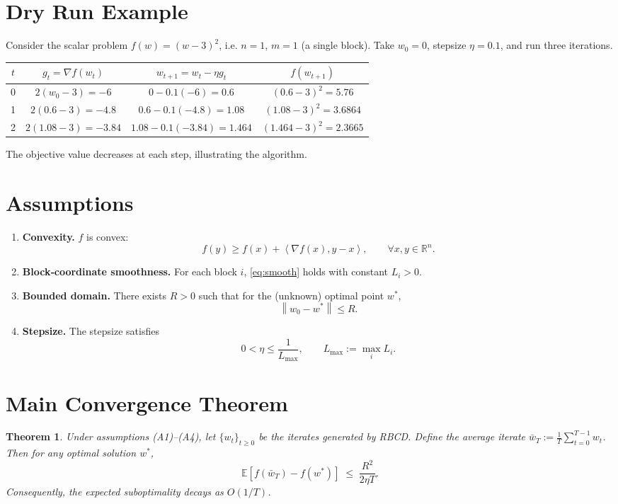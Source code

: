 \documentclass{article}
\newtheorem{theorem}{Theorem}
\newcommand{\E}{\mathbb{E}}
\newcommand{\R}{\mathbb{R}}
\newcommand{\norm}[1]{\left\|#1\right\|}
\newcommand{\ip}[2]{\left\langle #1,#2\right\rangle}
\begin{document}
\section*{Dry Run Example}
Consider the scalar problem $f(w)=(w-3)^2$, i.e. $n=1$, $m=1$ (a single block).  
Take $w_0=0$, stepsize $\eta=0.1$, and run three iterations.

\begin{center}
\begin{tabular}{c|c|c|c}
$t$ & $g_t=\nabla f(w_t)$ & $w_{t+1}=w_t-\eta g_t$ & $f(w_{t+1})$\\\hline
0 & $2(w_0-3)=-6$ & $0-0.1(-6)=0.6$ & $(0.6-3)^2=5.76$\\
1 & $2(0.6-3)=-4.8$ & $0.6-0.1(-4.8)=1.08$ & $(1.08-3)^2=3.6864$\\
2 & $2(1.08-3)=-3.84$ & $1.08-0.1(-3.84)=1.464$ & $(1.464-3)^2=2.3665$
\end{tabular}
\end{center}
The objective value decreases at each step, illustrating the algorithm.

\newpage

\section*{Assumptions}
\begin{enumerate}[label=(A\arabic*)]
\item \textbf{Convexity.} $f$ is convex:
\[
f(y)\ge f(x)+\ip{\nabla f(x)}{y-x},\qquad\forall x,y\in\R^{n}.
\tag{A1}
\]
\item \textbf{Block‑coordinate smoothness.} For each block $i$, \eqref{eq:smooth} holds with constant $L_i>0$.
\item \textbf{Bounded domain.} There exists $R>0$ such that for the (unknown) optimal point $w^{\ast}$,
\[
\norm{w_0-w^{\ast}}\le R .
\tag{A3}
\]
\item \textbf{Stepsize.} The stepsize satisfies
\[
0<\eta\le\frac{1}{L_{\max}},\qquad 
L_{\max}:=\max_{i}L_i .
\tag{A4}
\]
\end{enumerate}

\section*{Main Convergence Theorem}
\begin{theorem}
\label{thm:conv}
Under assumptions (A1)–(A4), let $\{w_t\}_{t\ge0}$ be the iterates generated by RBCD.  
Define the average iterate $\bar w_T:=\frac{1}{T}\sum_{t=0}^{T-1}w_t$.  
Then for any optimal solution $w^{\ast}$,
\[
\E\!\left[f(\bar w_T)-f(w^{\ast})\right]
\;\le\;
\frac{R^{2}}{2\eta T}.
\tag{T1}
\]
Consequently, the expected suboptimality decays as $O(1/T)$.
\end{theorem}
\end{document}
